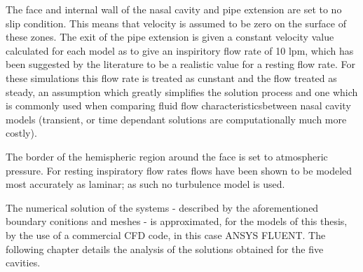The face and internal wall of the nasal cavity and pipe extension are set to no slip condition. This means that velocity is assumed to be zero on the surface of these zones. The exit of the pipe extension is given a constant velocity value calculated for each model as to give an inspiritory flow rate of 10 lpm, which has been suggested by the literature to be a realistic value for a resting flow rate. For these simulations this flow rate is treated as cunstant and the flow treated as steady, an assumption which greatly simplifies the solution process and one which is commonly used when comparing fluid flow characteristicsbetween nasal cavity models (transient, or time dependant solutions are computationally much more costly). 

The border of the hemispheric region around the face is set to atmospheric pressure. For resting inspiratory flow rates flows have been shown to be modeled most accurately as laminar; as such no turbulence model is used.

The numerical solution of the systems - described by the aforementioned boundary conitions and meshes - is approximated, for the models of this thesis, by the use of a commercial CFD code, in this case ANSYS FLUENT. The following chapter details the analysis of the solutions obtained for the five cavities.
